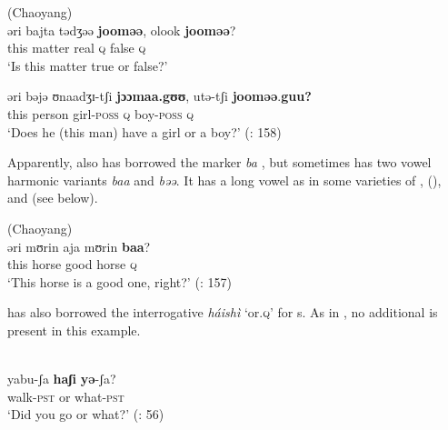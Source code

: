 \newpage
\ea%
    \label{ex:tungu:21}
     (Chaoyang)\\
    \ea
    \gll əri  bajta  tədʒəə \textbf{{jooməə}},  olook \textbf{{jooməə}}?\\
    this  matter  real  \textsc{q} false  \textsc{q}\\
    \glt ‘Is this matter true or false?’
    
    \ex
    \gll əri  bəjə  ʊnaadʒɪ-tʃi \textbf{{jɔɔmaa.gʊʊ}},  utə-tʃi \textbf{{jooməə}}.\textbf{{guu?}}\\
    this  person  girl-\textsc{poss}  \textsc{q}    boy-\textsc{poss}  \textsc{q}\\
    \glt ‘Does he (this man) have a girl or a boy?’ (\citealt{HuZengyi2001}: 158)
    \z
    \z

Apparently,  also has borrowed the  marker \textit{ba} , but sometimes has two vowel harmonic variants \textit{baa} and \textit{bəə}. It has a long vowel as in some varieties of ,  (), and  (see below).

\ea%
    \label{ex:tungu:22}
     (Chaoyang)\\
    \gll əri  mʊrin  aja  mʊrin \textbf{{baa}}?\\
    this  horse  good  horse  \textsc{q}\\
    \glt ‘This horse is a good one, right?’ (\citealt{HuZengyi2001}: 157)
    \z

 has also borrowed the  interrogative  \textit{háishì}  ‘or.\textsc{q}’ for s. As in , no additional  is present in this example.

\ea%
    \label{ex:tungu:23}
    \\
    \gll yabu-ʃa \textbf{{haʃi}} \textbf{{yə}}{-ʃa?}\\
    walk-\textsc{pst}  or  what-\textsc{pst}\\
    \glt ‘Did you go or what?’ (\citealt{LiFengxiang2005}: 56)
    \z

